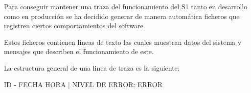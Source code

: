 Para conseguir mantener una traza del funcionamiento del \ac{S1} tanto en desarrollo como en producción se ha decidido generar de manera automática ficheros que registren ciertos comportamientos del software. 

Estos ficheros contienen lineas de texto las cuales muestran datos del sistema y mensajes que describen el funcionamiento de este.

La estructura general de una linea de traza es la siguiente:
\begin{center}
    {\large {ID} - {FECHA} {HORA} | {NIVEL DE ERROR}: {ERROR}}    
\end{center}


